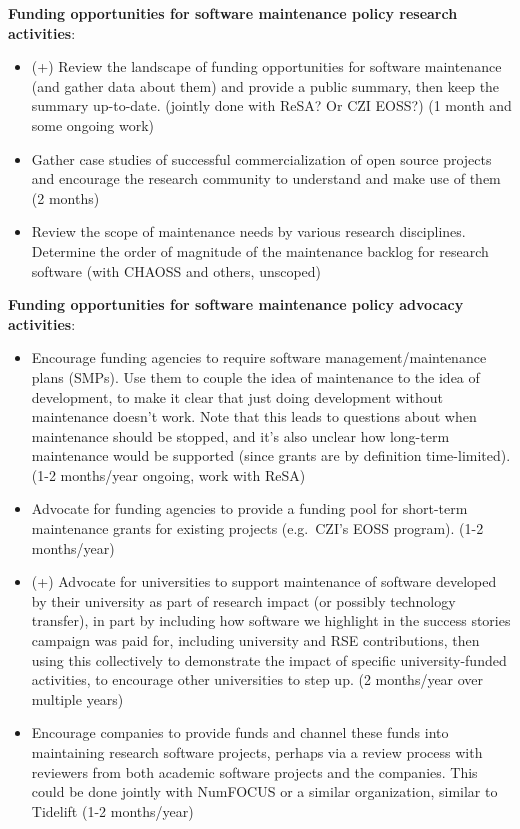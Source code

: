 \documentclass[
]{book}
\begin{document}
\textbf{Funding opportunities for software maintenance policy research activities}:

\begin{itemize}
\item
  (+) Review the landscape of funding opportunities for software maintenance (and gather data about them)
  and provide a public summary, then keep the summary up-to-date. (jointly done with ReSA? Or CZI EOSS?)
  (1 month and some ongoing work)
\item
  Gather case studies of successful commercialization of open source projects and encourage the
  research community to understand and make use of them (2 months)
\item
  Review the scope of maintenance needs by various research disciplines. Determine the order of
  magnitude of the maintenance backlog for research software (with CHAOSS and others, unscoped)
\end{itemize}

\textbf{Funding opportunities for software maintenance policy advocacy activities}:

\begin{itemize}
\item
  Encourage funding agencies to require software management/maintenance plans (SMPs).
  Use them to couple the idea of maintenance to the idea of development, to make it clear
  that just doing development without maintenance doesn't work. Note that this leads to
  questions about when maintenance should be stopped, and it's also unclear how long-term
  maintenance would be supported (since grants are by definition time-limited).
  (1-2 months/year ongoing, work with ReSA)
\item
  Advocate for funding agencies to provide a funding pool for short-term maintenance grants
  for existing projects (e.g.~CZI's EOSS program). (1-2 months/year)
\item
  (+) Advocate for universities to support maintenance of software developed by their university
  as part of research impact (or possibly technology transfer), in part by including how software
  we highlight in the success stories campaign was paid for, including university and RSE contributions,
  then using this collectively to demonstrate the impact of specific university-funded activities,
  to encourage other universities to step up. (2 months/year over multiple years)
\item
  Encourage companies to provide funds and channel these funds into maintaining research
  software projects, perhaps via a review process with reviewers from both academic software
  projects and the companies. This could be done jointly with NumFOCUS or a similar organization,
  similar to Tidelift (1-2 months/year)
\end{itemize}
\end{document}
